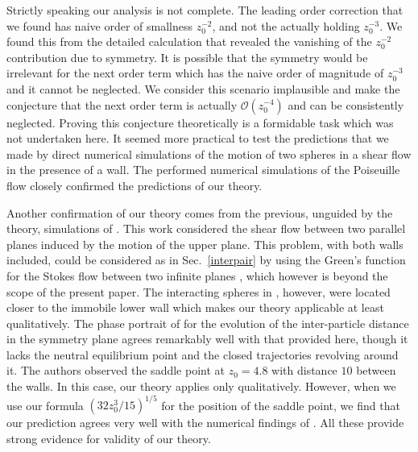 Strictly speaking our analysis is not complete. The leading order correction that we found has naive order of smallness $z_0^{-2}$, and not the actually holding $z_0^{-3}$. We found this from the detailed calculation that revealed the vanishing of the  $z_0^{-2}$ contribution due to symmetry. It is possible that the symmetry would be irrelevant for the next order term which has the naive order of magnitude of $z_0^{-3}$ and it cannot be neglected. We consider this scenario implausible and make the conjecture that the next order term is actually $\mathcal{O}(z_0^{-4})$ and can be consistently neglected. Proving this conjecture theoretically is a formidable task which was not undertaken here. It seemed more practical to test the predictions that we made by direct numerical simulations of the motion of two spheres in a shear flow in the presence of a wall. The performed numerical simulations of the Poiseuille flow closely confirmed the predictions of our theory.

Another confirmation of our theory comes from the previous, unguided by the theory, simulations of \cite{zurita-gotor_2007}. This work considered the shear flow between two parallel planes induced by the motion of the upper plane. This problem, with both walls included, could be considered as in Sec.\ \ref{interpair} by using the Green's function for the Stokes flow between two infinite planes \citep{LironMochon}, which however is beyond the scope of the present paper.
The interacting spheres in \cite{zurita-gotor_2007}, however, were located closer to the immobile lower wall which makes our theory applicable at least qualitatively.
The phase portrait of \cite{zurita-gotor_2007} for the evolution of the inter-particle distance in the symmetry plane agrees remarkably well with that provided here, though it lacks the neutral equilibrium point and the closed trajectories revolving around it. The authors observed the saddle point at $z_0=4.8$ with distance $10$ between the walls. In this case, our theory applies only qualitatively. However, when we use our formula $(32 z_0^3/15)^{1/5}$ for the position of the saddle point, we find that our prediction agrees very well with the numerical findings of \cite{zurita-gotor_2007}. All these provide strong evidence for validity of our theory.

